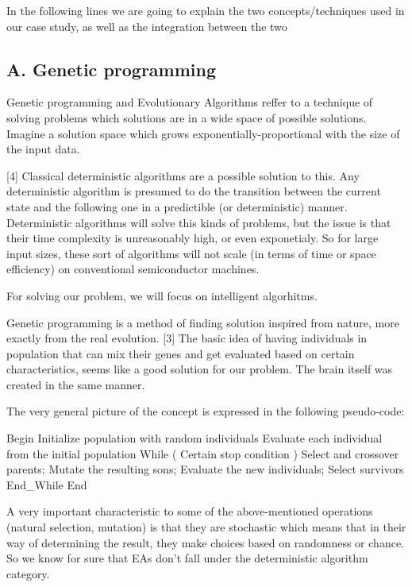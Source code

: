 \documentclass[11pt]{article}
\begin{document}
In the following lines we are going to explain the two
concepts/techniques used in our case study, as well as the integration
between the two

    \hypertarget{a.-genetic-programming}{%
\subsection{A. Genetic programming}\label{a.-genetic-programming}}

Genetic programming and Evolutionary Algorithms reffer to a technique of
solving problems which solutions are in a wide space of possible
solutions. Imagine a solution space which grows
exponentially-proportional with the size of the input data.

{[}4{]} Classical deterministic algorithms are a possible solution to
this. Any deterministic algorithm is presumed to do the transition
between the current state and the following one in a predictible (or
deterministic) manner. Deterministic algorithms will solve this kinds of
problems, but the issue is that their time complexity is unreasonably
high, or even exponetialy. So for large input sizes, these sort of
algorithms will not scale (in terms of time or space efficiency) on
conventional semiconductor machines.

For solving our problem, we will focus on intelligent algorhitms.

Genetic programming is a method of finding solution inspired from
nature, more exactly from the real evolution. {[}3{]} The basic idea of
having individuals in population that can mix their genes and get
evaluated based on certain characteristics, seems like a good solution
for our problem. The brain itself was created in the same manner.

The very general picture of the concept is expressed in the following
pseudo-code:

    Begin Initialize population with random individuals Evaluate each
individual from the initial population While ( Certain stop condition )
Select and crossover parents; Mutate the resulting sons; Evaluate the
new individuals; Select survivors End\_While End 

    A very important characteristic to some of the above-mentioned
operations (natural selection, mutation) is that they are stochastic
which means that in their way of determining the result, they make
choices based on randomness or chance. So we know for sure that EAs
don't fall under the deterministic algorithm category.
\end{document}

